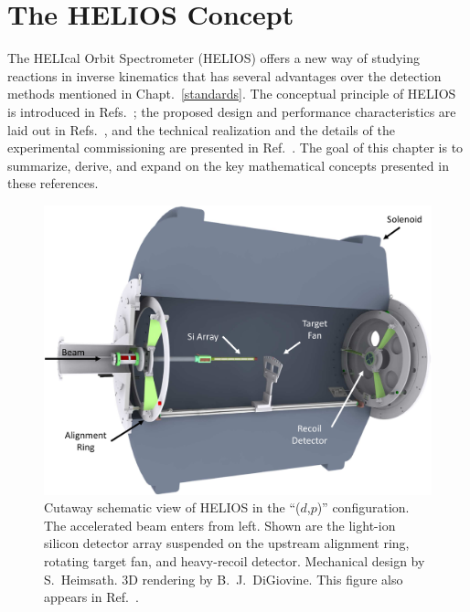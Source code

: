 \chapter{The HELIOS Concept}
\label{HELIOS_Concept}
The HELIcal Orbit Spectrometer (HELIOS) offers a new way of studying reactions in inverse kinematics that has several advantages over the detection methods mentioned in Chapt.~\ref{standards}.  The conceptual principle of HELIOS is introduced in Refs.~\cite{Schiffer_1998,Schiffer_2003}; the proposed design and performance characteristics are laid out in Refs.~\cite{Wuosmaa_2003,Wuosmaa_2007}, and the technical realization and the details of the experimental commissioning are presented in Ref.~\cite{Lighthall_2010}.  The goal of this chapter is to summarize, derive, and expand on the key mathematical concepts presented in these references.
\begin{figure}[!ht]
\centering
\includegraphics[width=\linewidth,height=0.5\textheight,keepaspectratio]{NIM_Paper/Figures/18pt_rot3}
\caption[Cutaway schematic view of HELIOS in the ``($d$,$p$)'' configuration]{Cutaway schematic view of HELIOS in the ``($d$,$p$)'' configuration.  The accelerated beam enters from left.  Shown are the light-ion silicon detector array suspended on the upstream alignment ring, rotating target fan, and heavy-recoil detector.  Mechanical design by S.~Heimsath.  3D rendering by B.~J.\ DiGiovine.  This figure also appears in Ref.~\cite{Lighthall_2010}.}
\label{schematic}
\end{figure}

